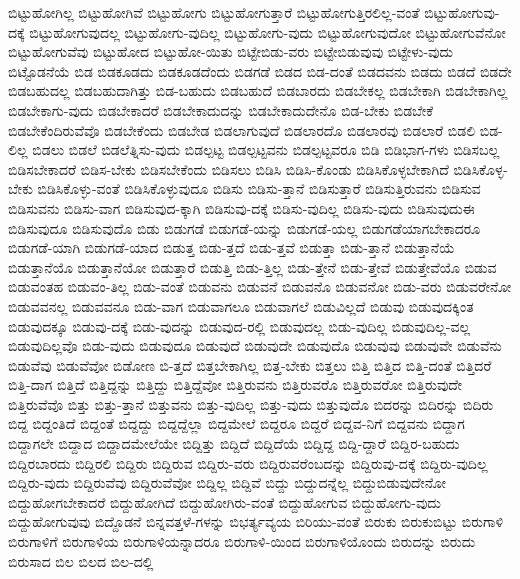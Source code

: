 {ಬಿಟ್ಟುಹೋಗಿಲ್ಲ
ಬಿಟ್ಟುಹೋಗಿವೆ
ಬಿಟ್ಟುಹೋಗು
ಬಿಟ್ಟುಹೋಗುತ್ತಾರೆ
ಬಿಟ್ಟುಹೋಗುತ್ತಿರಲಿಲ್ಲ-ವಂತೆ
ಬಿಟ್ಟುಹೋಗುವು-ದಕ್ಕೆ
ಬಿಟ್ಟುಹೋಗುವುದಲ್ಲ
ಬಿಟ್ಟುಹೋಗು-ವುದಿಲ್ಲ
ಬಿಟ್ಟುಹೋಗು-ವುದು
ಬಿಟ್ಟುಹೋಗುವುದೋ
ಬಿಟ್ಟುಹೋಗುವೆನೋ
ಬಿಟ್ಟುಹೋಗುವೆವು
ಬಿಟ್ಟುಹೋದ
ಬಿಟ್ಟುಹೋ-ಯಿತು
ಬಿಟ್ಟೇಬಿಡು-ವರು
ಬಿಟ್ಟೇಬಿಡುವುವು
ಬಿಟ್ಟೇಳು-ವುದು
ಬಿಟ್ಟೊಡನೆಯೆ
ಬಿಡ
ಬಿಡಕೂಡದು
ಬಿಡಕೂಡದೆಂದು
ಬಿಡಗಡೆ
ಬಿಡದ
ಬಿಡ-ದಂತೆ
ಬಿಡದವನು
ಬಿಡದು
ಬಿಡದೆ
ಬಿಡದೇ
ಬಿಡಬಹುದಲ್ಲ
ಬಿಡಬಹುದಾಗಿತ್ತು
ಬಿಡ-ಬಹುದು
ಬಿಡಬಹುದೆ
ಬಿಡಬಾರದು
ಬಿಡಬೇಕಲ್ಲ
ಬಿಡಬೇಕಾಗಿ
ಬಿಡಬೇಕಾಗಿಲ್ಲ
ಬಿಡಬೇಕಾಗು-ವುದು
ಬಿಡಬೇಕಾದರೆ
ಬಿಡಬೇಕಾದುದನ್ನು
ಬಿಡಬೇಕಾದುದೇನೊ
ಬಿಡ-ಬೇಕು
ಬಿಡಬೇಕೆ
ಬಿಡಬೇಕೆಂದಿರುವೆವೊ
ಬಿಡಬೇಕೆಂದು
ಬಿಡಬೇಡ
ಬಿಡಲಾಗುವುದೆ
ಬಿಡಲಾರದೊ
ಬಿಡಲಾರವು
ಬಿಡಲಾರೆ
ಬಿಡಲಿ
ಬಿಡ-ಲಿಲ್ಲ
ಬಿಡಲು
ಬಿಡಲೆ
ಬಿಡಲೆತ್ನಿಸು-ವುದು
ಬಿಡಲ್ಪಟ್ಟ
ಬಿಡಲ್ಪಟ್ಟವನು
ಬಿಡಲ್ಪಟ್ಟವರೂ
ಬಿಡಿ
ಬಿಡಿಭಾಗ-ಗಳು
ಬಿಡಿಸಬಲ್ಲ
ಬಿಡಿಸಬೇಕಾದರೆ
ಬಿಡಿಸ-ಬೇಕು
ಬಿಡಿಸಬೇಕೆಂದು
ಬಿಡಿಸಲು
ಬಿಡಿಸಿ
ಬಿಡಿಸಿ-ಕೊಂಡು
ಬಿಡಿಸಿಕೊಳ್ಳಬೇಕಾಗಿದೆ
ಬಿಡಿಸಿಕೊಳ್ಳ-ಬೇಕು
ಬಿಡಿಸಿಕೊಳ್ಳು-ವಂತೆ
ಬಿಡಿಸಿಕೊಳ್ಳುವುದೂ
ಬಿಡಿಸು
ಬಿಡಿಸು-ತ್ತಾನೆ
ಬಿಡಿಸುತ್ತಾರೆ
ಬಿಡಿಸುತ್ತಿರುವನು
ಬಿಡಿಸುವ
ಬಿಡಿಸುವನು
ಬಿಡಿಸು-ವಾಗ
ಬಿಡಿಸುವುದ-ಕ್ಕಾಗಿ
ಬಿಡಿಸುವು-ದಕ್ಕೆ
ಬಿಡಿಸು-ವುದಿಲ್ಲ
ಬಿಡಿಸು-ವುದು
ಬಿಡಿಸುವುದುಈ
ಬಿಡಿಸುವುದೂ
ಬಿಡಿಸುವುದೊ
ಬಿಡು
ಬಿಡುಗಡೆ
ಬಿಡುಗಡೆ-ಯನ್ನು
ಬಿಡುಗಡೆ-ಯಲ್ಲ
ಬಿಡುಗಡೆಯಾಗಬೇಕಾದರೂ
ಬಿಡುಗಡೆ-ಯಾಗಿ
ಬಿಡುಗಡೆ-ಯಾದ
ಬಿಡುತ್ತ
ಬಿಡು-ತ್ತದೆ
ಬಿಡು-ತ್ತವೆ
ಬಿಡುತ್ತಾ
ಬಿಡು-ತ್ತಾನೆ
ಬಿಡುತ್ತಾನೆಯೆ
ಬಿಡುತ್ತಾನೆಯೊ
ಬಿಡುತ್ತಾನೆಯೋ
ಬಿಡುತ್ತಾರೆ
ಬಿಡುತ್ತಿ
ಬಿಡು-ತ್ತಿಲ್ಲ
ಬಿಡು-ತ್ತೇನೆ
ಬಿಡು-ತ್ತೇವೆ
ಬಿಡುತ್ತೇವೆಯೊ
ಬಿಡುವ
ಬಿಡುವಂತಹ
ಬಿಡುವಂ-ತಿಲ್ಲ
ಬಿಡು-ವಂತೆ
ಬಿಡುವನು
ಬಿಡುವನೆ
ಬಿಡುವನೊ
ಬಿಡುವನೋ
ಬಿಡು-ವರು
ಬಿಡುವರೇನೋ
ಬಿಡುವವನಲ್ಲ
ಬಿಡುವವನೂ
ಬಿಡು-ವಾಗ
ಬಿಡುವಾಗಲೂ
ಬಿಡುವಾಗಲೆ
ಬಿಡುವಿಲ್ಲದೆ
ಬಿಡುವು
ಬಿಡುವುದಕ್ಕಿಂತ
ಬಿಡುವುದಕ್ಕೂ
ಬಿಡುವು-ದಕ್ಕೆ
ಬಿಡು-ವುದನ್ನು
ಬಿಡುವುದ-ರಲ್ಲಿ
ಬಿಡುವುದಲ್ಲ
ಬಿಡು-ವುದಿಲ್ಲ
ಬಿಡುವುದಿಲ್ಲ-ವಲ್ಲ
ಬಿಡುವುದಿಲ್ಲವೊ
ಬಿಡು-ವುದು
ಬಿಡುವುದೂ
ಬಿಡುವುದೆ
ಬಿಡುವುದೇ
ಬಿಡುವುದೊ
ಬಿಡುವುವು
ಬಿಡುವುವೇ
ಬಿಡುವೆನು
ಬಿಡುವೆವು
ಬಿಡುವೆವೋ
ಬಿಡೋಣ
ಬಿ-ತ್ತದೆ
ಬಿತ್ತಬೇಕಾಗಿಲ್ಲ
ಬಿತ್ತ-ಬೇಕು
ಬಿತ್ತಲು
ಬಿತ್ತಿ
ಬಿತ್ತಿದ
ಬಿತ್ತಿ-ದಂತೆ
ಬಿತ್ತಿದರೆ
ಬಿತ್ತಿ-ದಾಗ
ಬಿತ್ತಿದೆ
ಬಿತ್ತಿದ್ದನ್ನು
ಬಿತ್ತಿದ್ದು
ಬಿತ್ತಿದ್ದೆವೋ
ಬಿತ್ತಿರುವನು
ಬಿತ್ತಿರುವರೊ
ಬಿತ್ತಿರುವರೋ
ಬಿತ್ತಿರುವುದೇ
ಬಿತ್ತಿರುವೆವೊ
ಬಿತ್ತು
ಬಿತ್ತು-ತ್ತಾನೆ
ಬಿತ್ತುವನು
ಬಿತ್ತು-ವುದಿಲ್ಲ
ಬಿತ್ತು-ವುದು
ಬಿತ್ತುವುದೊ
ಬಿದರನ್ನು
ಬಿದಿರನ್ನು
ಬಿದಿರು
ಬಿದ್ದ
ಬಿದ್ದಂತಿದೆ
ಬಿದ್ದಂತೆ
ಬಿದ್ದದ್ದು
ಬಿದ್ದದ್ದೆಲ್ಲಾ
ಬಿದ್ದಮೇಲೆ
ಬಿದ್ದರೂ
ಬಿದ್ದರೆ
ಬಿದ್ದವ-ನಿಗೆ
ಬಿದ್ದವನು
ಬಿದ್ದಾಗ
ಬಿದ್ದಾಗಲೇ
ಬಿದ್ದಾದ
ಬಿದ್ದಾದಮೇಲೆಯೇ
ಬಿದ್ದಿತ್ತು
ಬಿದ್ದಿದೆ
ಬಿದ್ದಿದೆಯೆ
ಬಿದ್ದಿದ್ದ
ಬಿದ್ದಿ-ದ್ದಾರೆ
ಬಿದ್ದಿರ-ಬಹುದು
ಬಿದ್ದಿರಬಾರದು
ಬಿದ್ದಿರಲಿ
ಬಿದ್ದಿರು
ಬಿದ್ದಿರುವ
ಬಿದ್ದಿರು-ವರು
ಬಿದ್ದಿರುವರೆಂಬದನ್ನು
ಬಿದ್ದಿರುವು-ದಕ್ಕೆ
ಬಿದ್ದಿರು-ವುದಿಲ್ಲ
ಬಿದ್ದಿರು-ವುದು
ಬಿದ್ದಿರುವೆವು
ಬಿದ್ದಿರುವೆವೋ
ಬಿದ್ದಿಲ್ಲ
ಬಿದ್ದಿವೆ
ಬಿದ್ದು
ಬಿದ್ದುದನ್ನೆಲ್ಲ
ಬಿದ್ದುಬಿಡುವುದೇನೋ
ಬಿದ್ದುಹೋಗಬೇಕಾದರೆ
ಬಿದ್ದುಹೋಗಿದೆ
ಬಿದ್ದುಹೋಗಿರು-ವಂತೆ
ಬಿದ್ದುಹೋಗುವ
ಬಿದ್ದುಹೋಗು-ವುದು
ಬಿದ್ದುಹೋಗುವುವು
ಬಿದ್ದೊಡನೆ
ಬಿನ್ನವತ್ತಳೆ-ಗಳನ್ನು
ಬಿಭರ್ತ್ಯವ್ಯಯ
ಬಿರಿಯು-ವಂತೆ
ಬಿರುಕು
ಬಿರುಕುಬಿಟ್ಟು
ಬಿರುಗಾಳಿ
ಬಿರುಗಾಳಿಗೆ
ಬಿರುಗಾಳಿಯ
ಬಿರುಗಾಳಿಯನ್ನಾದರೂ
ಬಿರುಗಾಳಿ-ಯಿಂದ
ಬಿರುಗಾಳಿಯೊಂದು
ಬಿರುದನ್ನು
ಬಿರುದು
ಬಿರುಸಾದ
ಬಿಲ
ಬಿಲದ
ಬಿಲ-ದಲ್ಲಿ
}
